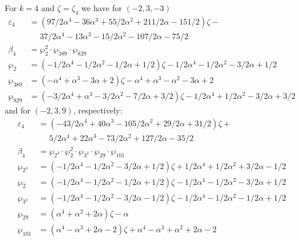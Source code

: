 \documentclass[12pt]{amsart}
\theoremstyle{definition}
\def\a{\alpha}
\def\z{\zeta}
\def\z{\zeta}
\begin{document}
\noindent 
For $k=4$ and $\zeta=\zeta_4$ we have for $(-2,3,-3)$
{\small
\begin{align*}
\varepsilon_{4} &= 
(97/2 \a^4 - 36 \a^3 + 55/2 \a^2 + 211/2 \a - 151/2) \z - 
\\ & \quad\,\,
37/2 \a^4 - 13 \a^3 - 15/2 \a^2 - 107/2 \a - 75/2
\\
\beta_{4} &= \wp_{2}^2 \cdot \wp_{389} \cdot \wp_{829} \\
\wp_{2} &=
(-1/2 \a^4 - 1/2 \a^2 - 1/2 \a + 1/2) \z - 1/2 \a^4 - 1/2 \a^2 - 3/2 \a + 1/2
\\
\wp_{389} &=
(-\a^4 + \a^3 - 3 \a + 2) \z - \a^4 + \a^3 - \a^2 - 3 \a + 2
\\
\wp_{829} &=
(-3/2 \a^4 + \a^3 - 3/2 \a^2 - 7/2 \a + 3/2) \z - 1/2 \a^4 + 1/2 \a^2 - 3/2 \a + 3/2
\end{align*}
}
and for $(-2,3,9)$, respectively:
{\small
\begin{align*}
\varepsilon_{4} &= 
(-43/2 \a^4 + 40 \a^3 - 105/2 \a^2 + 29/2 \a + 31/2) \z + 
\\ & \quad\,\,
5/2 \a^4 + 22 \a^3 - 73/2 \a^2 + 127/2 \a - 35/2
\\
\beta_{4} &= \wp_{2^3} \cdot \wp_{2}^2 \cdot \wp_{3^2}
\cdot \wp_{29} \cdot \wp_{101} \\
\wp_{2^3} &=
(-1/2 \a^4 - 1/2 \a^2 - 3/2 \a + 1/2) \z + 1/2 \a^4 + 1/2 \a^2 + 3/2 \a - 1/2
\\
\wp_{2} &=
(-1/2 \a^4 - 1/2 \a^2 - 1/2 \a + 1/2) \z - 1/2 \a^4 - 1/2 \a^2 - 3/2 \a + 1/2
\\
\wp_{3^2} &=
(-1/2 \a^4 - 1/2 \a^2 - 3/2 \a - 1/2) \z - 1/2 \a^4 - 1/2 \a^2 - 1/2 \a + 1/2
\\
\wp_{29} &= (\a^4 + \a^2 + 2 \a) \z - \a
\\
\wp_{101} &= (\a^4 - \a^3 + 2 \a - 2) \z + \a^4 - \a^3 + \a^2 + 2 \a - 2
\end{align*}
}
\end{document}
